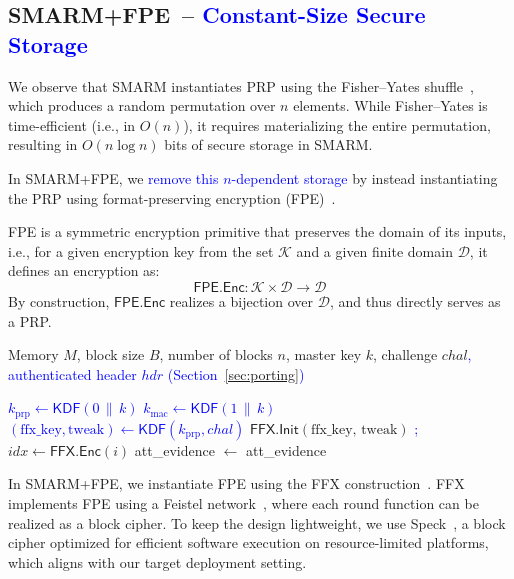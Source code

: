 \documentclass[journal]{IEEEtran}
\newcommand\ben[1]{\textcolor{blue}{#1}}
\newcommand{\rtsmarmtwo}{SMARM+FPE\xspace}
\begin{document}
\subsection{\rtsmarmtwo\ -- \ben{Constant-Size Secure Storage}}
\label{sec:rtsmarm-fpe}


We observe that SMARM instantiates PRP using the Fisher--Yates shuffle~\cite{fisherYates}, which produces a random permutation over $n$ elements.
While Fisher--Yates is time-efficient (i.e., in $O(n)$), it requires materializing the entire permutation, resulting in $O(n \log n)$ bits of secure storage in SMARM.


In \rtsmarmtwo, we \ben{remove this $n$-dependent storage} by instead instantiating the PRP using format-preserving encryption (FPE)~\cite{bellare2009format,ff1}.

FPE is a symmetric encryption primitive that preserves the domain of its inputs, i.e., for a given encryption key from the set $\mathcal{K}$ and a given finite domain $\mathcal{D}$, it defines an encryption as:
\[
\mathsf{FPE.Enc}: \mathcal{K} \times \mathcal{D} \rightarrow \mathcal{D}
\]
By construction, $\mathsf{FPE.Enc}$ realizes a bijection over $\mathcal{D}$, and thus directly serves as a PRP.

\begin{algorithm}[!t]
\caption{\rtsmarmtwo (secure world)}
\label{alg:rtsmarm-fpe}
\begin{algorithmic}[1]
\small
\Notation Memory $M$, block size $B$, number of blocks $n$, master key $k$, challenge $chal$\ben{, authenticated header $\mathit{hdr}$ (Section~\ref{sec:porting})}

\State \ben{$k_{\mathrm{prp}} \gets \mathsf{KDF}(0 \,\|\, k)$}
\State \ben{$k_{\mathrm{mac}} \gets \mathsf{KDF}(1 \,\|\, k)$}
\State \colorbox{codehl}{\ben{$(\text{ffx\_key}, \text{tweak}) \gets \mathsf{KDF}(k_{\mathrm{prp}}, chal)$}}
\State \colorbox{codehl}{$\mathsf{FFX.Init}(\text{ffx\_key, tweak})$}
\State \ben{; \Call{HMAC.Update}{hmac, $\mathit{hdr}$}}
    \State \colorbox{codehl}{$idx \gets \mathsf{FFX.Enc}(i)$}
    \State {}
    \State {}
    \State {}
\EndFor
\State att\_evidence $\gets$ 
\Output att\_evidence
\end{algorithmic}
\end{algorithm}

In \rtsmarmtwo, we instantiate FPE using the FFX construction~\cite{bellare2010ffx}.
FFX implements FPE using a Feistel network~\cite{hoang2010generalized}, where each round function can be realized as a block cipher.
To keep the design lightweight, we use Speck~\cite{speck}, a block cipher optimized for efficient software execution on resource-limited platforms, which aligns with our target deployment setting.
\end{document}
